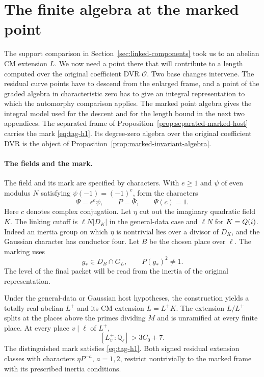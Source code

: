 \section{The finite algebra at the marked point}
\label{sec:marked-hosts}

The support comparison in Section~\ref{sec:linked-components} took us to an abelian CM
extension \(L\). We now need a point there that will contribute to a length computed
over the original coefficient DVR \(\mathcal O\).
Two base changes intervene. The residual curve
points have to descend from the enlarged frame, and a point of
the graded algebra in characteristic zero has to give an integral
representation to which the automorphy comparison applies.
The marked point algebra gives the integral model used for the
descent and for the length bound in the next two appendices. The separated frame of Proposition~\ref{prop:separated-marked-host} carries the mark \eqref{eq:tag-h1}. Its degree-zero algebra over the original coefficient DVR is the object of Proposition~\ref{prop:marked-invariant-algebra}.

\paragraph{The fields and the mark.}
The field and its mark are specified by characters. With
\(e\ge1\) and \(\psi\) of even modulus \(N\) satisfying \(\psi(-1)=(-1)^e\), form the characters
\[
 \Psi=\epsilon^e\psi,\qquad P=\bar\Psi,\qquad \Psi(c)=1 .
\] Here \(c\) denotes complex conjugation.
Let \(\eta\) cut out the imaginary quadratic field \(K\). The
linking cutoff is \(\ell N|D_K|\) in the general-data case and
\(\ell N\) for \(K=Q(i)\). Indeed an inertia group on which
\(\eta\) is nontrivial lies over a divisor of \(D_K\), and the
Gaussian character has conductor four. Let \(B\) be the chosen
place over \(\ell\). The marking uses
\[
       g_*\in D_B\cap G_L,\qquad P(g_*)^2\ne1 .
       \tag{H1}\label{eq:tag-h1}
\]
The level of the final packet will be read from the inertia of
the original representation.

\begin{proposition}\label{prop:separated-marked-host}
Under the general-data or Gaussian host hypotheses, the
construction yields a totally real abelian \(L^+\) and its
CM extension \(L=L^+K\). The extension \(L/L^+\) splits
at the places above the primes dividing \(M\) and is unramified
at every finite place. At every place \(v\mid\ell\) of \(L^+\),
\[
                     [L_v^+:\mathbb Q_\ell]>3C_0+7.
\]
The distinguished mark satisfies
\textup{\eqref{eq:tag-h1}}. Both signed residual extension classes with
characters \(\eta P^{-a}\), \(a=1,2\), restrict nontrivially
to the marked frame with its prescribed inertia conditions.
\end{proposition}

